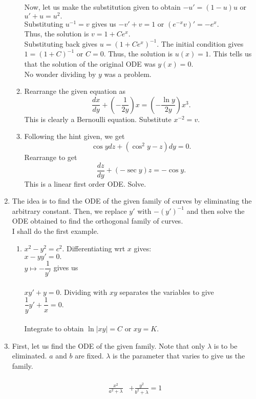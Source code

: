 \documentclass{article}
\begin{document}
\begin{enumerate}[label = Q.\arabic*.]
\begin{enumerate}[label = (\roman*)]
		Now, let us make the substitution given to obtain $-u' = (1 - u)u$ or $u' + u = u^2.$\\
		Substituting $u^{-1} = v$ gives us $-v' + v = 1$ or $(e^{-x}v)' = -e^x.$\\
		Thus, the solution is $v = 1 + Ce^x.$\\
		Substituting back gives $u = (1 + Ce^x)^{-1}.$ The initial condition gives $1 = (1 + C)^{-1}$ or $C = 0.$ Thus, the solution is $u(x) = 1.$ This tells us that the solution of the original ODE was $y(x) = 0.$\\
		No wonder dividing by $y$ was a problem.
		\item Rearrange the given equation as
		\[\frac{dx}{dy} +  \left(-\frac{1}{2y}\right)x = \left(-\frac{\ln y}{2y}\right)x^3.\]
		This is clearly a Bernoulli equation. Substitute $x^{-2} = v.$
		\item Following the hint given, we get
		\[\cos ydz + (\cos^2y - z)dy = 0.\]
		Rearrange to get
		\[\frac{dz}{dy} + \left(-\sec y\right)z = -\cos y.\]
		This is a linear first order ODE. Solve.
	\end{enumerate}
	\item The idea is to find the ODE of the given family of curves by eliminating the arbitrary constant. Then, we replace $y'$ with $-(y')^{-1}$ and then solve the ODE obtained to find the orthogonal family of curves.\\
	I shall do the first example.
	\begin{enumerate}[label = (\roman*)] 
		\item $x^2 - y^2 = c^2.$ Differentiating wrt $x$ gives:\\
		$x - yy' = 0.$\\
		$y \mapsto -\dfrac{1}{y'}$ gives us\\~\\
		$xy' + y = 0.$ Dividing with $xy$ separates the variables to give\\
		$\dfrac{1}{y}y' + \dfrac{1}{x} = 0.$\\~\\
		Integrate to obtain $\ln|xy| = C$ or $xy = K.$
	\end{enumerate}
	\item First, let us find the ODE of the given family. Note that only $\lambda$ is to be eliminated. $a$ and $b$ are fixed. $\lambda$ is the parameter that varies to give us the family.\\~\\
	\begin{align*} 
		\frac{x^2}{a^2 + \lambda} & + \frac{y^2}{b^2 + \lambda} = 1\\

\end{align*}
\end{enumerate}
\end{document}
